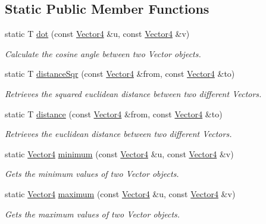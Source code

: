 \subsection*{Static Public Member Functions}
\begin{DoxyCompactItemize}
\item 
static T \hyperlink{classsparky_1_1_vector4_aada67cdecb5f9a4fb2705e20ec4a962f}{dot} (const \hyperlink{classsparky_1_1_vector4}{Vector4} \&u, const \hyperlink{classsparky_1_1_vector4}{Vector4} \&v)
\begin{DoxyCompactList}\small\item\em Calculate the cosine angle between two Vector objects. \end{DoxyCompactList}\item 
static T \hyperlink{classsparky_1_1_vector4_a15726483fd70946390f4bcdd88ab2a98}{distance\+Sqr} (const \hyperlink{classsparky_1_1_vector4}{Vector4} \&from, const \hyperlink{classsparky_1_1_vector4}{Vector4} \&to)
\begin{DoxyCompactList}\small\item\em Retrieves the squared euclidean distance between two different Vectors. \end{DoxyCompactList}\item 
static T \hyperlink{classsparky_1_1_vector4_aadafd46d59d06e0cfc44bf66d5273e11}{distance} (const \hyperlink{classsparky_1_1_vector4}{Vector4} \&from, const \hyperlink{classsparky_1_1_vector4}{Vector4} \&to)
\begin{DoxyCompactList}\small\item\em Retrieves the euclidean distance between two different Vectors. \end{DoxyCompactList}\item 
static \hyperlink{classsparky_1_1_vector4}{Vector4} \hyperlink{classsparky_1_1_vector4_a950a470bc20e206ec093e13d0cc1483e}{minimum} (const \hyperlink{classsparky_1_1_vector4}{Vector4} \&u, const \hyperlink{classsparky_1_1_vector4}{Vector4} \&v)
\begin{DoxyCompactList}\small\item\em Gets the minimum values of two Vector objects. \end{DoxyCompactList}\item 
static \hyperlink{classsparky_1_1_vector4}{Vector4} \hyperlink{classsparky_1_1_vector4_a26591960c9236b65dc32af7019b40e46}{maximum} (const \hyperlink{classsparky_1_1_vector4}{Vector4} \&u, const \hyperlink{classsparky_1_1_vector4}{Vector4} \&v)
\begin{DoxyCompactList}\small\item\em Gets the maximum values of two Vector objects. \end{DoxyCompactList}\item 

\end{DoxyCompactItemize}
